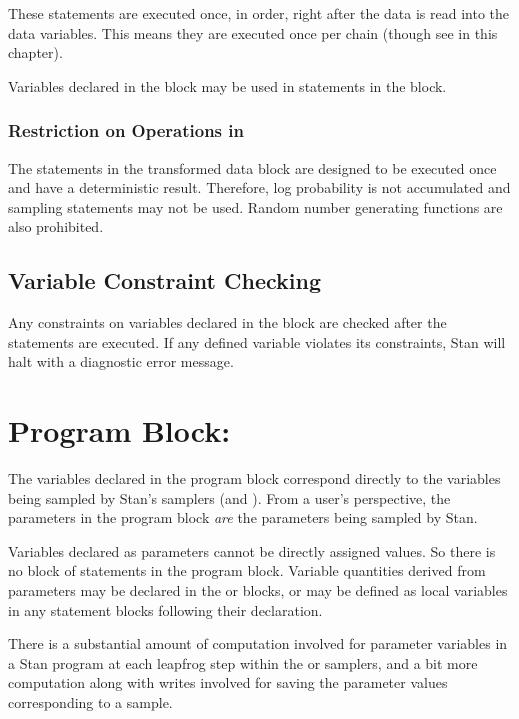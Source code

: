 These statements are executed once, in order, right after the data is
read into the data variables.  This means they are executed once per
chain (though see  in this chapter).

Variables declared in the  block may be used in statements
in the  block.

\subsubsection{Restriction on Operations in }

The statements in the transformed data block are designed to be
executed once and have a deterministic result.  Therefore, log
probability is not accumulated and sampling statements may not be
used.  Random number generating functions are also prohibited.

\subsection{Variable Constraint Checking}

Any constraints on variables declared in the 
block are checked after the statements are executed.  If any defined
variable violates its constraints, Stan will halt with a diagnostic
error message.


\section{Program Block: }

The variables declared in the  program block
correspond directly to the variables being sampled by Stan's samplers
(\HMC and \NUTS).  From a user's perspective, the parameters in the
program block \emph{are} the parameters being sampled by Stan.

Variables declared as parameters cannot be directly assigned values.
So there is no block of statements in the  program
block.  Variable quantities derived from parameters may be declared in
the  or  blocks,
or may be defined as local variables in any statement blocks following
their declaration.

There is a substantial amount of computation involved for parameter
variables in a Stan program at each leapfrog step within the
\HMC or \NUTS samplers, and a bit more computation along with writes
involved for saving the parameter values corresponding to a sample.

